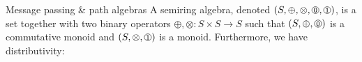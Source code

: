 \documentclass{beamer}
\begin{document}
    \begin{frame}[fragile]{Message passing \& path algebras}
    A semiring algebra, denoted $(S, \oplus, \otimes, \circled{0}, \circled{1})$, is a set together with two binary operators $\oplus, \otimes: S \times S \rightarrow S$ such that $(S, \oplus, \circled{0})$ is a commutative monoid and $(S, \otimes, \circled{1})$ is a monoid. Furthermore, we have distributivity:



\end{frame}
\end{document}
